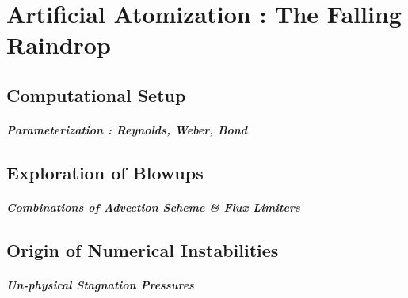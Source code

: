 \setchapterpreamble[u]{\margintoc}
\chapter{Artificial Atomization : The Falling Raindrop}


\section{Computational Setup}

\paragraph{Parameterization : Reynolds, Weber, Bond}
\blindtext


\section{Exploration of Blowups}

\paragraph{Combinations of Advection Scheme \& Flux Limiters}
\blindtext


\section{Origin of Numerical Instabilities}

\paragraph{Un-physical Stagnation Pressures}
\blindtext


